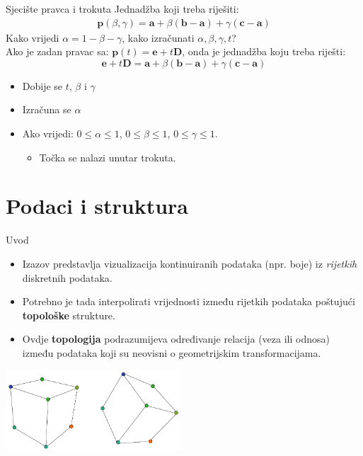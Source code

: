 \documentclass[9pt]{beamer}
\begin{document}
\begin{frame}{Sjecište pravca i trokuta}
	Jednadžba koji treba riješiti:
	\begin{align*}
		\textbf{p}(\beta, \gamma) = \textbf{a} + \beta(\textbf{b}-\textbf{a}) + \gamma(\textbf{c}-\textbf{a})
	\end{align*}
	Kako vrijedi $\alpha = 1- \beta - \gamma$, kako izračunati $\alpha, \beta, \gamma, t$? \\
	Ako je zadan pravac sa: $\textbf{p}(t) = \textbf{e}+t\textbf{D}$, onda je jednadžba koju treba riješti:
	$$\textbf{e}+t\textbf{D} = \textbf{a} + \beta(\textbf{b}-\textbf{a}) + \gamma(\textbf{c}-\textbf{a})$$
	\begin{itemize}
		\item Dobije se $t$, $\beta$ i $\gamma$
		\item Izračuna se $\alpha$
		\item Ako vrijedi: $0 \leq \alpha \leq 1$, $0 \leq \beta \leq 1$, $0 \leq \gamma \leq 1$.
		\begin{itemize}
			\item Točka se nalazi unutar trokuta.
		\end{itemize}
	\end{itemize}
\end{frame}

\section{Podaci i struktura}
\begin{frame}{Uvod}
	\begin{itemize}
		\item Izazov predstavlja vizualizacija  kontinuiranih podataka (npr. boje) iz \textit{rijetkih} diskretnih podataka. 
		\item Potrebno je tada interpolirati vrijednosti između rijetkih podataka poštujući \textbf{topološke} strukture.
		\item Ovdje \textbf{topologija} podrazumijeva određivanje relacija (veza ili odnosa) između podataka  koji su neovisni o geometrijskim transformacijama.
	\end{itemize}

\begin{center}
	\includegraphics[height=3cm]{slike/wireframe_kocke.png}
\end{center}

\end{frame}
\end{document}
